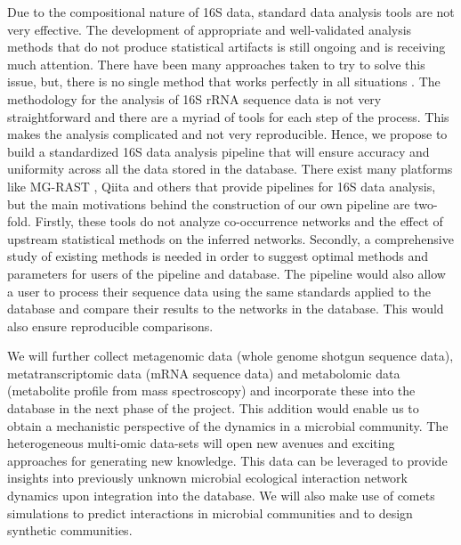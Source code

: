    Due to the compositional nature of 16S data, standard data analysis tools are not very effective.
    The development of appropriate and well-validated analysis methods that do not produce statistical artifacts is still ongoing and is receiving much attention. There have been many approaches taken to try to solve this issue, but, there is no single method that works perfectly in all situations \cite{Golob2017,Weiss2016}.
    The methodology for the analysis of 16S rRNA sequence data is not very straightforward and there are a myriad of tools for each step of the process.
    This makes the analysis complicated and not very reproducible.
    Hence, we propose to build a standardized 16S data analysis pipeline that will ensure accuracy and uniformity across all the data stored in the database.
    There exist many platforms like MG-RAST \cite{Keegan2016}, Qiita \cite{qiita} and others that provide pipelines for 16S data analysis, but the main motivations behind the construction of our own pipeline are two-fold.
    Firstly, these tools do not analyze co-occurrence networks and the effect of upstream statistical methods on the inferred networks.
    Secondly, a comprehensive study of existing methods is needed in order to suggest optimal methods and parameters for users of the pipeline and database.
    The pipeline would also allow a user to process their sequence data using the same standards applied to the database and compare their results to the networks in the database.
    This would also ensure reproducible comparisons.

    We will further collect metagenomic data (whole genome shotgun sequence data), metatranscriptomic data (mRNA sequence data) and metabolomic data (metabolite profile from mass spectroscopy) and incorporate these into the database in the next phase of the project.
    This addition would enable us to obtain a mechanistic perspective of the dynamics in a microbial community.
    The heterogeneous multi-omic data-sets will open new avenues and exciting approaches for generating new knowledge.
    This data can be leveraged to provide insights into previously unknown microbial ecological interaction network dynamics upon integration into the database.
    We will also make use of \ac{comets} simulations to predict interactions in microbial communities and to design synthetic communities.

